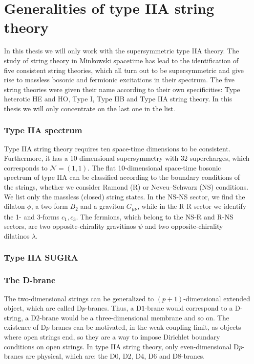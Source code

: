 \chapter{Generalities of type IIA string theory}

In this thesis we will only work with the supersymmetric type IIA theory. 
The study of string theory in Minkowski spacetime has lead to the identification of five consistent string theories, which all turn out to be supersymmetric and give rise to massless bosonic and fermionic excitations in their spectrum. The five string theories were given their name according to their own specificities: Type heterotic HE and HO, Type I, Type IIB and Type IIA string theory. In this thesis we will only concentrate on the last one in the list. 

\subsection{Type IIA spectrum}
Type IIA string theory requires ten space-time dimensions to be consistent.
Furthermore, it has a 10-dimensional supersymmetry with 32 supercharges, which corresponds to $\mathcal N=(1,1)$.
The flat 10-dimensional space-time bosonic spectrum of type IIA can be classified according to
the boundary conditions of the strings, whether we consider Ramond (R) or Neveu–Schwarz (NS) conditions.
We list only the massless (closed) string states.
In the NS-NS sector, we find the dilaton $\phi$, a two-form $B_2$ and a graviton $G_{\mu\nu}$,
while in the R-R sector we identify the 1- and 3-forms $c_1, c_3$.
The fermions, which belong to the NS-R and R-NS sectors, are two opposite-chirality gravitinos $\psi$ and two opposite-chirality dilatinos $\lambda$.

\subsection{Type IIA SUGRA}

\subsection{The D-brane}

The two-dimensional strings can be generalized to $(p+1)$-dimensional extended object, which are called D$p$-branes.
Thus, a D$1$-brane would correspond to a D-string, a D$2$-brane would be a three-dimensional membrane and so on.
The existence of D$p$-branes can be motivated, in the weak coupling limit, as 
objects where open strings end, so they are a way to impose Dirichlet boundary conditions on open strings.
In type IIA string theory, only even-dimensional D$p$-branes are physical, which are: the D$0$, D$2$, D$4$, D$6$ and D$8$-branes.

